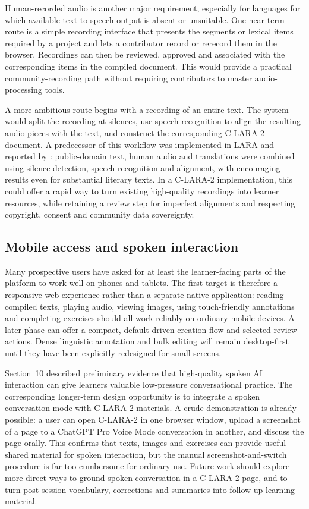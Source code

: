 Human-recorded audio is another major requirement, especially for languages
for which available text-to-speech output is absent or unsuitable. One
near-term route is a simple recording interface that presents the segments or
lexical items required by a project and lets a contributor record or rerecord
them in the browser. Recordings can then be reviewed, approved and associated
with the corresponding items in the compiled document. This would provide a
practical community-recording path without requiring contributors to master
audio-processing tools.

A more ambitious route begins with a recording of an entire text. The system
would split the recording at silences, use speech recognition to align the
resulting audio pieces with the text, and construct the corresponding
C-LARA-2 document. A predecessor of this workflow was implemented in LARA and
reported by \citet{RaynerChieraChua2022}: public-domain text, human audio and
translations were combined using silence detection, speech recognition and
alignment, with encouraging results even for substantial literary texts. In a
C-LARA-2 implementation, this could offer a rapid way to turn existing
high-quality recordings into learner resources, while retaining a review step
for imperfect alignments and respecting copyright, consent and community data
sovereignty.

\subsection{Mobile access and spoken interaction}

Many prospective users have asked for at least the learner-facing parts of the
platform to work well on phones and tablets. The first target is therefore a
responsive web experience rather than a separate native application: reading
compiled texts, playing audio, viewing images, using touch-friendly
annotations and completing exercises should all work reliably on ordinary
mobile devices. A later phase can offer a compact, default-driven creation
flow and selected review actions. Dense linguistic annotation and bulk editing
will remain desktop-first until they have been explicitly redesigned for small
screens.

Section~10 described preliminary evidence that high-quality spoken AI
interaction can give learners valuable low-pressure conversational practice.
The corresponding longer-term design opportunity is to integrate a spoken
conversation mode with C-LARA-2 materials. A crude demonstration is already
possible: a user can open C-LARA-2 in one browser window, upload a screenshot
of a page to a ChatGPT Pro Voice Mode conversation in another, and discuss the
page orally. This confirms that texts, images and exercises can provide useful
shared material for spoken interaction, but the manual screenshot-and-switch
procedure is far too cumbersome for ordinary use. Future work should explore
more direct ways to ground spoken conversation in a C-LARA-2 page, and to turn
post-session vocabulary, corrections and summaries into follow-up learning
material.

